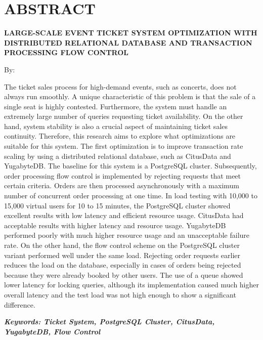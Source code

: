 \clearpage
\chapter*{ABSTRACT}

\begin{center}
  \center
  \begin{singlespace}
    \large\bfseries\MakeUppercase{Large-Scale Event Ticket System Optimization with Distributed Relational Database and Transaction Processing Flow Control}

    \normalfont\normalsize
    By:

    \bfseries \theauthor
  \end{singlespace}
\end{center}


\begin{singlespace}
  \small
  The ticket sales process for high-demand events, such as concerts, does not always run smoothly. A unique characteristic of this problem is that the sale of a single seat is highly contested. Furthermore, the system must handle an extremely large number of queries requesting ticket availability. On the other hand, system stability is also a crucial aspect of maintaining ticket sales continuity. Therefore, this research aims to explore what optimizations are suitable for this system. The first optimization is to improve transaction rate scaling by using a distributed relational database, such as CitusData and YugabyteDB. The baseline for this system is a PostgreSQL cluster. Subsequently, order processing flow control is implemented by rejecting requests that meet certain criteria. Orders are then processed asynchronously with a maximum number of concurrent order processing at one time. In load testing with 10,000 to 15,000 virtual users for 10 to 15 minutes, the PostgreSQL cluster showed excellent results with low latency and efficient resource usage. CitusData had acceptable results with higher latency and resource usage. YugabyteDB performed poorly with much higher resource usage and an unacceptable failure rate. On the other hand, the flow control scheme on the PostgreSQL cluster variant performed well under the same load. Rejecting order requests earlier reduces the load on the database, especially in cases of orders being rejected because they were already booked by other users. The use of a queue showed lower latency for locking queries, although its implementation caused much higher overall latency and the test load was not high enough to show a significant difference.

  \textbf{\textit{Keywords: Ticket System, PostgreSQL Cluster, CitusData, YugabyteDB, Flow Control}}
\end{singlespace}
\clearpage

\clearpage